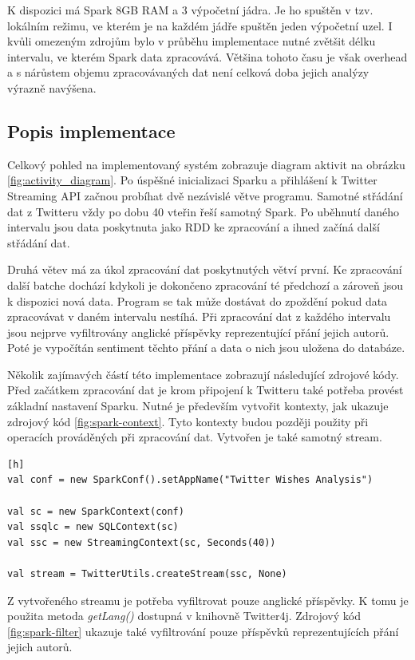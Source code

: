 \documentclass[thesis=B,czech]{FITthesis}[2012/06/26]
\begin{document}
K dispozici má Spark 8GB RAM a 3 výpočetní jádra. Je ho spuštěn v tzv. lokálním režimu, ve kterém je na každém jádře spuštěn jeden výpočetní uzel. I kvůli omezeným zdrojům bylo v průběhu implementace nutné zvětšit délku intervalu, ve kterém Spark data zpracovává. Většina tohoto času je však overhead a s nárůstem objemu zpracovávaných dat není celková doba jejich analýzy výrazně navýšena. 

\subsection{Popis implementace}

Celkový pohled na implementovaný systém zobrazuje diagram aktivit na obrázku \ref{fig:activity_diagram}. Po úspěšné inicializaci Sparku a přihlášení k Twitter Streaming API začnou probíhat dvě nezávislé větve programu. Samotné střádání dat z Twitteru vždy po dobu 40 vteřin řeší samotný Spark. Po uběhnutí daného intervalu jsou data poskytnuta jako RDD ke zpracování a ihned začíná další střádání dat. 

Druhá větev má za úkol zpracování dat poskytnutých větví první. Ke zpracování další batche dochází kdykoli je dokončeno zpracování té předchozí a zároveň jsou k dispozici nová data. Program se tak může dostávat do zpoždění pokud data zpracovávat v daném intervalu nestíhá. Při zpracování dat z každého intervalu jsou nejprve vyfiltrovány anglické příspěvky reprezentující přání jejich autorů. Poté je vypočítán sentiment těchto přání a data o nich jsou uložena do databáze. 

Několik zajímavých částí této implementace zobrazují následující zdrojové kódy. Před začátkem zpracování dat je krom připojení k Twitteru také potřeba provést základní nastavení Sparku. Nutné je především vytvořit kontexty, jak ukazuje zdrojový kód \ref{fig:spark-context}. Tyto kontexty budou později použity při operacích prováděných při zpracování dat. Vytvořen je také samotný stream. 


\begin{lstlisting}[caption={Vytvoření kontextů a streamu},label=fig:spark-context][h]
val conf = new SparkConf().setAppName("Twitter Wishes Analysis")

val sc = new SparkContext(conf)
val ssqlc = new SQLContext(sc)
val ssc = new StreamingContext(sc, Seconds(40))

val stream = TwitterUtils.createStream(ssc, None)
\end{lstlisting}

Z vytvořeného streamu je potřeba vyfiltrovat pouze anglické příspěvky. K tomu je použita metoda \textit{getLang()} dostupná v knihovně Twitter4j. Zdrojový kód \ref{fig:spark-filter} ukazuje také vyfiltrování pouze příspěvků reprezentujících přání jejich autorů. 
\end{document}

